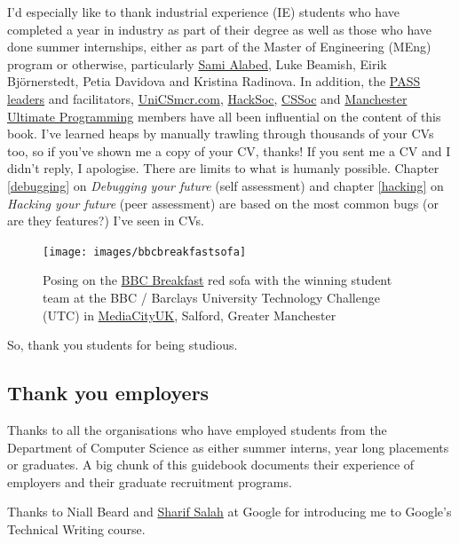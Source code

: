\documentclass[
]{book}
\begin{document}
I'd especially like to thank industrial experience (IE) students who have completed a year in industry as part of their degree as well as those who have done summer internships, either as part of the Master of Engineering (MEng) program or otherwise, particularly \href{https://github.com/samialabed}{Sami Alabed}, Luke Beamish, Eirik Björnerstedt, Petia Davidova and Kristina Radinova. In addition, the \href{http://www.pass.manchester.ac.uk}{PASS leaders} and facilitators, \href{https://unicsmcr.com/}{UniCSmcr.com}, \href{https://github.com/unicsmcr/hacksoc.com}{HackSoc}, \href{https://github.com/cssoc}{CSSoc} and \href{https://github.com/Man-UP}{Manchester Ultimate Programming} members have all been influential on the content of this book. I've learned heaps by manually trawling through thousands of your CVs too, so if you've shown me a copy of your CV, thanks! If you sent me a CV and I didn't reply, I apologise. There are limits to what is humanly possible. Chapter \ref{debugging} on \emph{Debugging your future} (self assessment) and chapter \ref{hacking} on \emph{Hacking your future} (peer assessment) are based on the most common bugs (or are they features?) I've seen in CVs.

\begin{figure}

{\centering \texttt{[image: images/bbcbreakfastsofa]} 

}

\caption{Posing on the \href{https://en.wikipedia.org/wiki/BBC_Breakfast}{BBC Breakfast} red sofa with the winning student team at the BBC / Barclays University Technology Challenge (UTC) in \href{https://en.wikipedia.org/wiki/MediaCityUK}{MediaCityUK}, Salford, Greater Manchester}\label{fig:unnamed-chunk-3}
\end{figure}



So, thank you students for being studious. 🙏

\hypertarget{employers}{%
\subsection{Thank you employers}\label{employers}}

Thanks to all the organisations who have employed students from the Department of Computer Science as either summer interns, year long placements or graduates. A big chunk of this guidebook documents their experience of employers and their graduate recruitment programs.

Thanks to Niall Beard and \href{https://github.com/sharifsalah}{Sharif Salah} at Google for introducing me to Google's Technical Writing course. \citep{googling}
\end{document}
